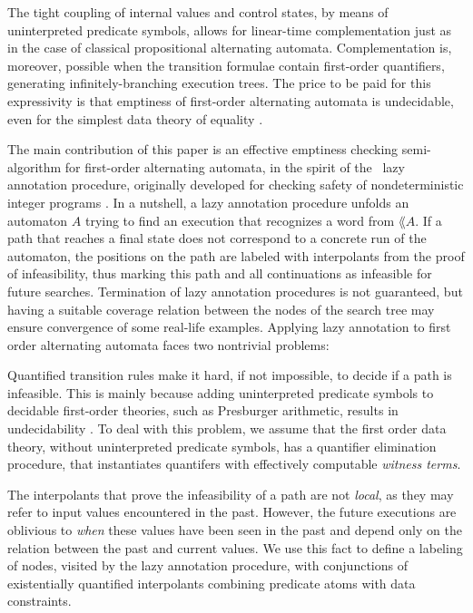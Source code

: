The tight coupling of internal values and control states, by means of
uninterpreted predicate symbols, allows for linear-time
complementation just as in the case of classical propositional
alternating automata. Complementation is, moreover, possible when the
transition formulae contain first-order quantifiers, generating
infinitely-branching execution trees. The price to be paid for this
expressivity is that emptiness of first-order alternating automata is
undecidable, even for the simplest data theory of equality
\cite{Farzan15}.

The main contribution of this paper is an effective emptiness checking
semi-algorithm for first-order alternating automata, in the spirit of
the \impact~lazy annotation procedure, originally developed for
checking safety of nondeterministic integer programs
\cite{McMillan06,McMillan14}. In a nutshell, a lazy annotation
procedure unfolds an automaton $A$ trying to find an execution that
recognizes a word from $\lang{A}$. If a path that reaches a final
state does not correspond to a concrete run of the automaton, the
positions on the path are labeled with interpolants from the proof of
infeasibility, thus marking this path and all continuations as
infeasible for future searches. Termination of lazy annotation
procedures is not guaranteed, but having a suitable coverage relation
between the nodes of the search tree may ensure convergence of some
real-life examples. Applying lazy annotation to first order
alternating automata faces two nontrivial
problems: \begin{compactenum}
\item Quantified transition rules make it hard, if not impossible, to
  decide if a path is infeasible. This is mainly because adding
  uninterpreted predicate symbols to decidable first-order theories,
  such as Presburger arithmetic, results in undecidability
  \cite{Halpern91}. To deal with this problem, we assume that the
  first order data theory, without uninterpreted predicate symbols,
  has a quantifier elimination procedure, that instantiates quantifers
  with effectively computable \emph{witness terms}.
%
\item The interpolants that prove the infeasibility of a path are not
  \emph{local}, as they may refer to input values encountered in the
  past. However, the future executions are oblivious to \emph{when}
  these values have been seen in the past and depend only on the
  relation between the past and current values. We use this fact to
  define a labeling of nodes, visited by the lazy annotation
  procedure, with conjunctions of existentially quantified
  interpolants combining predicate atoms with data constraints.
\end{compactenum}


